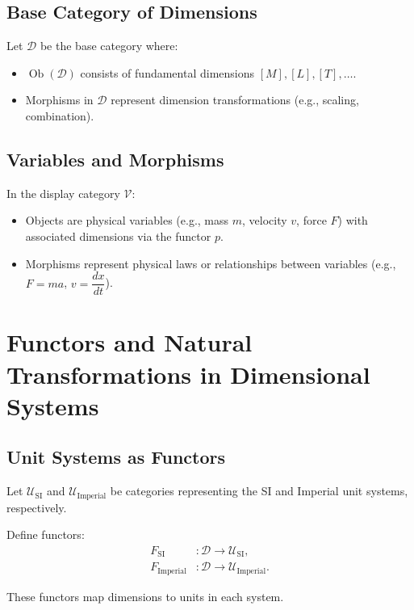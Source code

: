 \documentclass{article}
\theoremstyle{definition}
\theoremstyle{remark}
\begin{document}
	\subsection{Base Category of Dimensions}
	
	Let $\mathcal{D}$ be the base category where:
	\begin{itemize}
		\item $\operatorname{Ob}(\mathcal{D})$ consists of fundamental dimensions $[M], [L], [T], \dots$.
		\item Morphisms in $\mathcal{D}$ represent dimension transformations (e.g., scaling, combination).
	\end{itemize}
	
	\subsection{Variables and Morphisms}
	
	In the display category $\mathcal{V}$:
	\begin{itemize}
		\item Objects are physical variables (e.g., mass $m$, velocity $v$, force $F$) with associated dimensions via the functor $p$.
		\item Morphisms represent physical laws or relationships between variables (e.g., $F = m a$, $v = \dfrac{dx}{dt}$).
	\end{itemize}
	
	\section{Functors and Natural Transformations in Dimensional Systems}
	
	\subsection{Unit Systems as Functors}
	
	Let $\mathcal{U}_{\text{SI}}$ and $\mathcal{U}_{\text{Imperial}}$ be categories representing the SI and Imperial unit systems, respectively.
	
	Define functors:
	\begin{align*}
		F_{\text{SI}} &: \mathcal{D} \rightarrow \mathcal{U}_{\text{SI}}, \\
		F_{\text{Imperial}} &: \mathcal{D} \rightarrow \mathcal{U}_{\text{Imperial}}.
	\end{align*}
	
	These functors map dimensions to units in each system.
	
\end{document}
